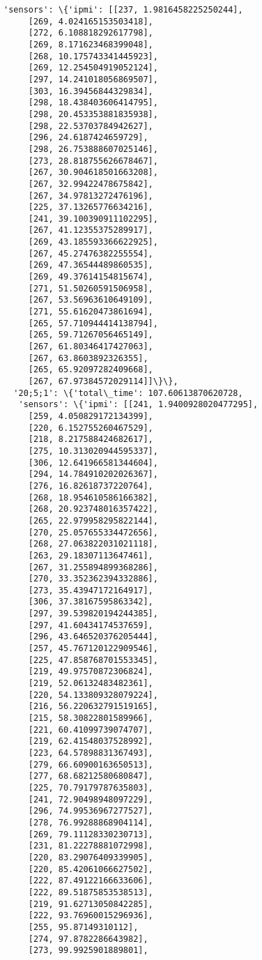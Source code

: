 \documentclass[11pt]{article}
\begin{document}
\begin{tcolorbox}[breakable, size=fbox, boxrule=.5pt, pad at break*=1mm, opacityfill=0]
\begin{Verbatim}[commandchars=\\\{\}]
   'sensors': \{'ipmi': [[237, 1.9816458225250244],
     [269, 4.024165153503418],
     [272, 6.108818292617798],
     [269, 8.171623468399048],
     [268, 10.175743341445923],
     [269, 12.254504919052124],
     [297, 14.241018056869507],
     [303, 16.39456844329834],
     [298, 18.438403606414795],
     [298, 20.453353881835938],
     [298, 22.53703784942627],
     [296, 24.6187424659729],
     [298, 26.753888607025146],
     [273, 28.818755626678467],
     [267, 30.904618501663208],
     [267, 32.99422478675842],
     [267, 34.97813272476196],
     [225, 37.13265776634216],
     [241, 39.100390911102295],
     [267, 41.12355375289917],
     [269, 43.185593366622925],
     [267, 45.27476382255554],
     [269, 47.36544489860535],
     [269, 49.37614154815674],
     [271, 51.50260591506958],
     [267, 53.56963610649109],
     [271, 55.61620473861694],
     [265, 57.710944414138794],
     [265, 59.71267056465149],
     [267, 61.80346417427063],
     [267, 63.8603892326355],
     [265, 65.92097282409668],
     [267, 67.97384572029114]]\}\},
  '20;5;1': \{'total\_time': 107.60613870620728,
   'sensors': \{'ipmi': [[241, 1.9400928020477295],
     [259, 4.050829172134399],
     [220, 6.152755260467529],
     [218, 8.217588424682617],
     [275, 10.313020944595337],
     [306, 12.641966581344604],
     [294, 14.784910202026367],
     [276, 16.82618737220764],
     [268, 18.954610586166382],
     [268, 20.923748016357422],
     [265, 22.979958295822144],
     [270, 25.057655334472656],
     [268, 27.063822031021118],
     [263, 29.18307113647461],
     [267, 31.255894899368286],
     [270, 33.352362394332886],
     [273, 35.43947172164917],
     [306, 37.38167595863342],
     [297, 39.539820194244385],
     [297, 41.60434174537659],
     [296, 43.646520376205444],
     [257, 45.767120122909546],
     [225, 47.858768701553345],
     [219, 49.97570872306824],
     [219, 52.06132483482361],
     [220, 54.133809328079224],
     [216, 56.220632791519165],
     [215, 58.30822801589966],
     [221, 60.41099739074707],
     [219, 62.41548037528992],
     [223, 64.57898831367493],
     [279, 66.60900163650513],
     [277, 68.68212580680847],
     [225, 70.79179787635803],
     [241, 72.90498948097229],
     [296, 74.99536967277527],
     [278, 76.99288868904114],
     [269, 79.11128330230713],
     [231, 81.22278881072998],
     [220, 83.29076409339905],
     [220, 85.42061066627502],
     [222, 87.49122166633606],
     [222, 89.51875853538513],
     [219, 91.62713050842285],
     [222, 93.76960015296936],
     [255, 95.87149310112],
     [274, 97.8782286643982],
     [273, 99.9925901889801],

\end{Verbatim}
\end{tcolorbox}
\end{document}
